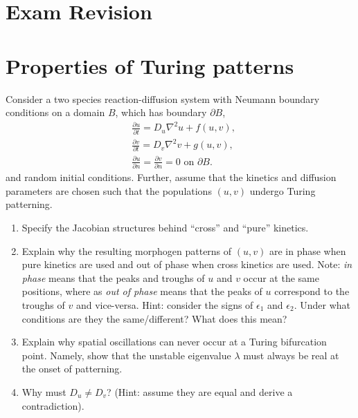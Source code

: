 \documentclass[10pt]{article}
\newcommand{\D}[2]{\frac{\partial #1}{\partial #2}}
\begin{document}
\section*{Exam Revision}

\section{Properties of Turing patterns}
Consider a two species reaction-diffusion system with Neumann boundary conditions on a domain $B$, which has boundary $\partial B$,
\begin{align}
&\D{u}{t}=D_u\nabla^2u + f(u,v),\label{general1}\\
&\D{v}{t}=D_v\nabla^2v + g(u,v),\label{general2}\\
&\D{u}{n}=\D{v}{n}=0 \textrm{ on } \partial B.
\end{align}
 and random initial conditions. Further, assume that the kinetics and diffusion parameters are chosen such that the populations $(u,v)$ undergo  Turing patterning.
\begin{enumerate}
\item  Specify the Jacobian structures behind ``cross'' and ``pure'' kinetics.

\item  Explain why the resulting morphogen patterns of $(u,v)$ are in phase when pure kinetics are used and out of phase when cross kinetics are used. Note: \textit{in phase} means that the peaks and troughs of $u$ and $v$ occur at the same positions, where as \textit{out of phase} means that the peaks of $u$ correspond to the troughs of $v$ and vice-versa. Hint: consider the signs of $\epsilon_1$ and $\epsilon_2$. Under what conditions are they the same/different? What does this mean?

\item Explain why spatial oscillations can never occur at a Turing bifurcation point. Namely, show that the unstable eigenvalue $\lambda$ must always be real at the onset of patterning.

\item Why must $D_u\neq D_v$? (Hint: assume they are equal and derive a contradiction).
\end{enumerate}
\end{document}
